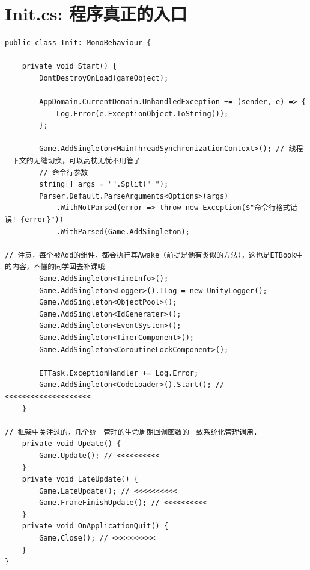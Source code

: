 \documentclass[9pt, b5paper]{article}
\begin{document}
\section{Init.cs: 程序真正的入口}
\label{sec-9}
\begin{verbatim}
public class Init: MonoBehaviour {

    private void Start() {
        DontDestroyOnLoad(gameObject);
            
        AppDomain.CurrentDomain.UnhandledException += (sender, e) => {
            Log.Error(e.ExceptionObject.ToString());
        };
                
        Game.AddSingleton<MainThreadSynchronizationContext>(); // 线程上下文的无缝切换，可以高枕无忧不用管了
        // 命令行参数
        string[] args = "".Split(" ");
        Parser.Default.ParseArguments<Options>(args)
            .WithNotParsed(error => throw new Exception($"命令行格式错误! {error}"))
            .WithParsed(Game.AddSingleton);

// 注意，每个被Add的组件，都会执行其Awake（前提是他有类似的方法），这也是ETBook中的内容，不懂的同学回去补课哦
        Game.AddSingleton<TimeInfo>();
        Game.AddSingleton<Logger>().ILog = new UnityLogger();
        Game.AddSingleton<ObjectPool>();
        Game.AddSingleton<IdGenerater>();
        Game.AddSingleton<EventSystem>();
        Game.AddSingleton<TimerComponent>();
        Game.AddSingleton<CoroutineLockComponent>();
            
        ETTask.ExceptionHandler += Log.Error;
        Game.AddSingleton<CodeLoader>().Start(); // <<<<<<<<<<<<<<<<<<<< 
    }
        
// 框架中关注过的，几个统一管理的生命周期回调函数的一致系统化管理调用. 
    private void Update() {
        Game.Update(); // <<<<<<<<<< 
    }
    private void LateUpdate() {
        Game.LateUpdate(); // <<<<<<<<<< 
        Game.FrameFinishUpdate(); // <<<<<<<<<< 
    }
    private void OnApplicationQuit() {
        Game.Close(); // <<<<<<<<<< 
    }
}
\end{verbatim}
\end{document}
